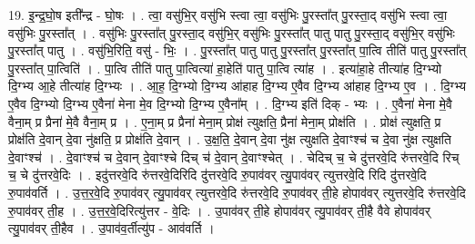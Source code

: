 \documentclass[17pt]{extarticle}
\begin{document}
19. इ॒न्द्र॒घो॒ष इती᳚न्द्र - घो॒षः । . त्वा॒ वसु॑भि॒र् वसु॑भि स्त्वा त्वा॒ वसु॑भिः पु॒रस्ता᳚त् पु॒रस्ता॒द् वसु॑भि स्त्वा त्वा॒ वसु॑भिः पु॒रस्ता᳚त् । . वसु॑भिः पु॒रस्ता᳚त् पु॒रस्ता॒द् वसु॑भि॒र् वसु॑भिः पु॒रस्ता᳚त् पातु पातु पु॒रस्ता॒द् वसु॑भि॒र् वसु॑भिः पु॒रस्ता᳚त् पातु । . वसु॑भि॒रिति॒ वसु॑ - भिः॒ । . पु॒रस्ता᳚त् पातु पातु पु॒रस्ता᳚त् पु॒रस्ता᳚त् पा॒त्वि तीति॑ पातु पु॒रस्ता᳚त् पु॒रस्ता᳚त् पा॒त्विति॑ । . पा॒त्वि तीति॑ पातु पा॒त्वित्या॑ हा॒हेति॑ पातु पा॒त्वि त्या॑ह । . इत्या॑हा॒हे तीत्या॑ह दि॒ग्भ्यो दि॒ग्भ्य आ॒हे तीत्या॑ह दि॒ग्भ्यः । . आ॒ह॒ दि॒ग्भ्यो दि॒ग्भ्य आ॑हाह दि॒ग्भ्य ए॒वैव दि॒ग्भ्य आ॑हाह दि॒ग्भ्य ए॒व । . दि॒ग्भ्य ए॒वैव दि॒ग्भ्यो दि॒ग्भ्य ए॒वैना॑ मेना मे॒व दि॒ग्भ्यो दि॒ग्भ्य ए॒वैना᳚म् । . दि॒ग्भ्य इति॑ दिक् - भ्यः । . ए॒वैना॑ मेना मे॒वै वैना॒म् प्र प्रैना॑ मे॒वै वैना॒म् प्र । . ए॒ना॒म् प्र प्रैना॑ मेना॒म् प्रोक्ष॑ त्युक्षति॒ प्रैना॑ मेना॒म् प्रोक्ष॑ति । . प्रोक्ष॑ त्युक्षति॒ प्र प्रोक्ष॑ति दे॒वान् दे॒वा नु॑क्षति॒ प्र प्रोक्ष॑ति दे॒वान् । . उ॒क्ष॒ति॒ दे॒वान् दे॒वा नु॑क्ष त्युक्षति दे॒वाꣳश्च॑ च दे॒वा नु॑क्ष त्युक्षति दे॒वाꣳश्च॑ । . दे॒वाꣳश्च॑ च दे॒वान् दे॒वाꣳश्चे दिच् च॑ दे॒वान् दे॒वाꣳश्चेत् । . चेदिच् च॒ चे दु॑त्तरवे॒दि रु॑त्तरवे॒दि रिच् च॒ चे दु॑त्तरवे॒दिः । . इदु॑त्तरवे॒दि रु॑त्तरवे॒दिरिदि दु॑त्तरवे॒दि रु॒पाव॑वर् त्यु॒पाव॑वर् त्युत्तरवे॒दि रिदि दु॑त्तरवे॒दि रु॒पाव॑वर्ति । . उ॒त्त॒र॒वे॒दि रु॒पाव॑वर् त्यु॒पाव॑वर् त्युत्तरवे॒दि रु॑त्तरवे॒दि रु॒पाव॑वर् ती॒हे होपाव॑वर् त्युत्तरवे॒दि रु॑त्तरवे॒दि रु॒पाव॑वर् ती॒ह । . उ॒त्त॒र॒वे॒दिरित्यु॑त्तर - वे॒दिः । . उ॒पाव॑वर् ती॒हे होपाव॑वर् त्यु॒पाव॑वर् ती॒है वैवे होपाव॑वर् त्यु॒पाव॑वर् ती॒हैव । . उ॒पाव॑व॒र्तीत्यु॑प - आव॑वर्ति । \newline
\end{document}
